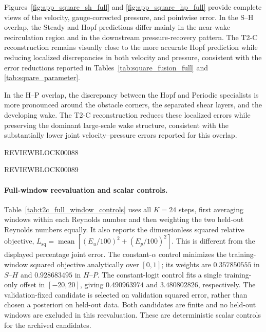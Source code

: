 \documentclass{article}
\begin{document}
Figures~\ref{fig:app_square_sh_full} and \ref{fig:app_square_hp_full} provide complete views of the velocity, gauge-corrected pressure, and pointwise error. In the S--H overlap, the Steady and Hopf predictions differ mainly in the near-wake recirculation region and in the downstream pressure-recovery pattern. The T2-C reconstruction remains visually close to the more accurate Hopf prediction while reducing localized discrepancies in both velocity and pressure, consistent with the error reductions reported in Tables~\ref{tab:square_fusion_full} and \ref{tab:square_parameter}.

In the H--P overlap, the discrepancy between the Hopf and Periodic specialists is more pronounced around the obstacle corners, the separated shear layers, and the developing wake. The T2-C reconstruction reduces these localized errors while preserving the dominant large-scale wake structure, consistent with the substantially lower joint velocity--pressure errors reported for this overlap.

\par


REVIEWBLOCK00088


\par

\par


REVIEWBLOCK00089


\par


\paragraph{Full-window reevaluation and scalar controls.}
Table~\ref{tab:t2c_full_window_controls} uses all $K=24$ steps, first
averaging windows within each Reynolds number and then weighting the
two held-out Reynolds numbers equally. It also reports the dimensionless
squared relative objective, $L_{\mathrm{sq}}=\operatorname{mean}
[(E_u/100)^2+(E_p/100)^2]$. This is different from the displayed
percentage joint error. The constant-$\alpha$ control minimizes the
training-window squared objective analytically over $[0,1]$; its weights
are $0.357850555$ in $S$--$H$ and $0.928683495$ in $H$--$P$.
The constant-logit control fits a single training-only offset in
$[-20,20]$, giving $0.490963974$ and $3.480802826$, respectively.
The validation-fixed candidate is selected on validation squared error,
rather than chosen a posteriori on held-out data. Both candidates are
finite and no held-out windows are excluded in this reevaluation.
These are deterministic scalar controls for the archived candidates.
\end{document}
